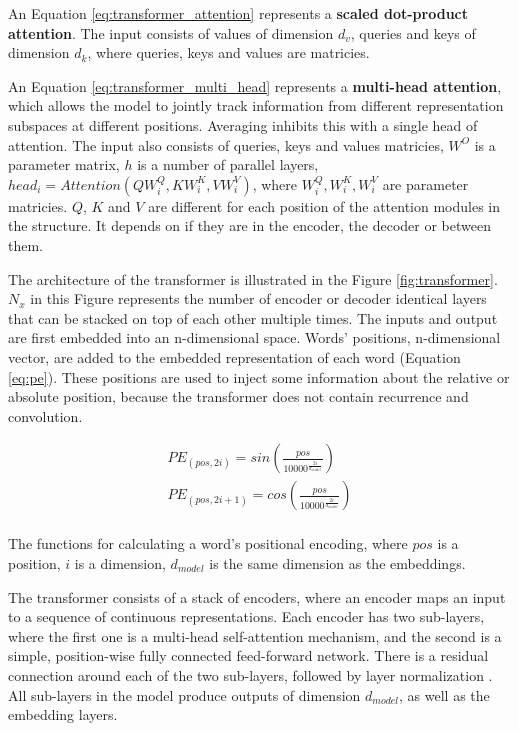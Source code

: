 An Equation \ref{eq:transformer_attention} represents a \textbf{scaled dot-product attention}. The input consists of values of dimension $d_v$, queries and keys of dimension $d_k$, where queries, keys and values are matricies.

An Equation \ref{eq:transformer_multi_head} represents a \textbf{multi-head attention}, which allows the model to jointly track information from different representation subspaces at different positions. Averaging inhibits this with a single head of attention. The input also consists of queries, keys and values matricies, $W^O$ is a parameter matrix, $h$ is a number of parallel layers, $head_i = Attention(QW_i^Q, KW_i^K, VW_i^V)$, where $W_i^Q, W_i^K, W_i^V$ are parameter matricies. $Q$, $K$ and $V$ are different for each position of the attention modules in the structure. It depends on if they are in the encoder, the decoder or between them.

The architecture of the transformer is illustrated in the Figure \ref{fig:transformer}. $N_x$ in this Figure represents the number of encoder or decoder identical layers that can be stacked on top of each other multiple times. The inputs and output are first embedded into an n-dimensional space. Words' positions, n-dimensional vector, are added to the embedded representation of each word (Equation \ref{eq:pe}). These positions are used to inject some information about the relative or absolute position, because the transformer does not contain recurrence and convolution. 

\begin{eqfloat} [H]
\begin{equation} \label{eq:pe}
\begin{array}{lcl} 
PE_{(pos, 2i)} = sin(\frac{pos}{10000^{\frac{2i}{d_{model}}}}) \\

PE_{(pos, 2i+1)} = cos(\frac{pos}{10000^{\frac{2i}{d_{model}}}})\\
\end{array}
\end{equation}
\caption{The functions for calculating a word's positional encoding, where $pos$ is a position, $i$ is a dimension, $d_{model}$ is the same dimension as the embeddings.}
\end{eqfloat}

The transformer consists of a stack of encoders, where an encoder maps an input to a sequence of continuous representations. Each encoder has two sub-layers, where the first one is a multi-head self-attention mechanism, and the second is a simple, position-wise fully connected feed-forward network. There is a residual connection \cite{he2016deep} around each of the two sub-layers, followed by layer normalization \cite{ba2016layer}. All sub-layers in the model produce outputs of dimension $d_{model}$, as well as the embedding layers.

